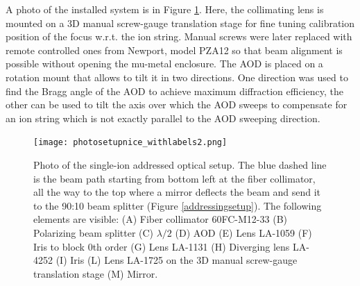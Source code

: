 A photo of the installed system is in Figure \ref{photosetup}. Here, the collimating lens is mounted on a 3D manual screw-gauge translation stage for fine tuning calibration position of the focus w.r.t. the ion string. Manual screws were later replaced with remote controlled ones from Newport, model PZA12 so that beam alignment is possible without opening the mu-metal enclosure. The AOD is placed on a rotation mount that allows to tilt it in two directions. One direction was used to find the Bragg angle of the AOD to achieve maximum diffraction efficiency, the other can be used to tilt the axis over which the AOD sweeps to compensate for an ion string which is not exactly parallel to the AOD sweeping direction.

\begin{figure}[H]
\centering
\texttt{[image: photosetupnice\_withlabels2.png]}
\caption{Photo of the single-ion addressed optical setup. The blue dashed line is the beam path starting from bottom left at the fiber collimator, all the way to the top where a mirror deflects the beam and send it to the 90:10 beam splitter (Figure \ref{addressingsetup}). The following elements are visible: (A) Fiber collimator 60FC-M12-33 (B) Polarizing beam splitter (C) $\lambda/2$ (D) AOD (E) Lens LA-1059 (F) Iris to block 0th order (G) Lens LA-1131 (H) Diverging lens LA-4252 (I) Iris (L) Lens LA-1725 on the 3D manual screw-gauge translation stage (M) Mirror. }
\label{photosetup}
\end{figure}
